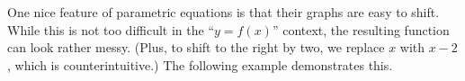 
One nice feature of parametric equations is that their graphs are easy to shift. While this is not too difficult in the ``$y=f(x)$'' context, the resulting function can look rather messy. (Plus, to shift to the right by two, we replace $x$ with $x-2$, which is counterintuitive.) The following example demonstrates this.

